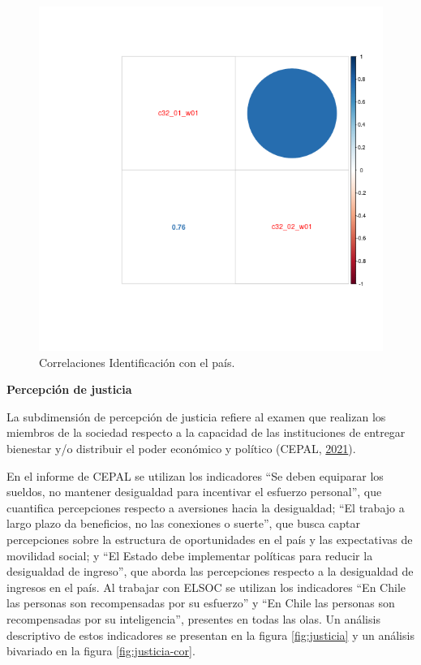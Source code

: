 \documentclass[
  12pt,
]{book}
\begin{document}
\begin{figure}[H]

{\centering \includegraphics[width=1\linewidth,height=1\textheight]{output/graphs/identificacion_cor} 

}

\caption{Correlaciones Identificación con el país.}\label{fig:identificacion-cor}
\end{figure}

\textbf{Percepción de justicia}

La subdimensión de percepción de justicia refiere al examen que realizan los miembros de la sociedad respecto a la capacidad de las instituciones de entregar bienestar y/o distribuir el poder económico y político (CEPAL, \protect\hyperlink{ref-cepal_Cohesion_2021}{2021}).

En el informe de CEPAL se utilizan los indicadores ``Se deben equiparar los sueldos, no mantener desigualdad para incentivar el esfuerzo personal'', que cuantifica percepciones respecto a aversiones hacia la desigualdad; ``El trabajo a largo plazo da beneficios, no las conexiones o suerte'', que busca captar percepciones sobre la estructura de oportunidades en el país y las expectativas de movilidad social; y ``El Estado debe implementar políticas para reducir la desigualdad de ingreso'', que aborda las percepciones respecto a la desigualdad de ingresos en el país. Al trabajar con ELSOC se utilizan los indicadores ``En Chile las personas son recompensadas por su esfuerzo'' y ``En Chile las personas son recompensadas por su inteligencia'', presentes en todas las olas. Un análisis descriptivo de estos indicadores se presentan en la figura \ref{fig:justicia} y un análisis bivariado en la figura \ref{fig:justicia-cor}.
\end{document}
